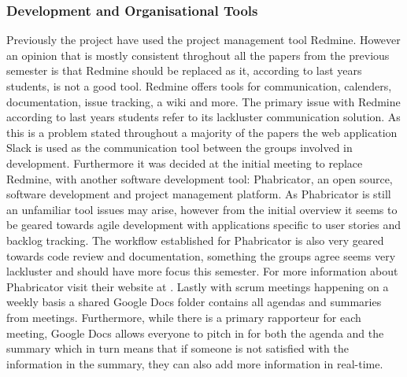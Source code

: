 \subsubsection*{Development and Organisational Tools}
Previously the project have used the project management tool Redmine.
However an opinion that is mostly consistent throghout all the papers from the previous semester is that Redmine should be replaced as it, according to last years students, is not a good tool.
Redmine offers tools for communication, calenders, documentation, issue tracking, a wiki and more.
The primary issue with Redmine according to last years students refer to its lackluster communication solution.
As this is a problem stated throughout a majority of the papers the web application Slack is used as the communication tool between the groups involved in development.
Furthermore it was decided at the initial meeting to replace Redmine, with another software development tool: Phabricator, an open source, software development and project management platform. 
As Phabricator is still an unfamiliar tool issues may arise, however from the initial overview it seems to be geared towards agile development with applications specific to user stories and backlog tracking.
The workflow established for Phabricator is also very geared towards code review and documentation, something the groups agree seems very lackluster and should have more focus this semester.
For more information about Phabricator visit their website at \cite{phabricatorWebsite}.
Lastly with scrum meetings happening on a weekly basis a shared Google Docs folder contains all agendas and summaries from meetings.
Furthermore, while there is a primary rapporteur for each meeting, Google Docs allows everyone to pitch in for both the agenda and the summary which in turn means that if someone is not satisfied with the information in the summary, they can also add more information in real-time.

